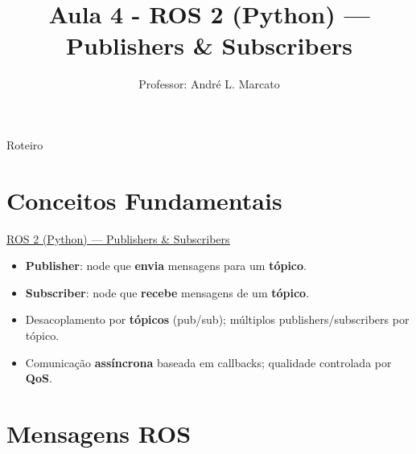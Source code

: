 \title[Aula 4]{Aula 4 - ROS 2 (Python) — Publishers \& Subscribers}
\author[Marcato]{Professor: André L. Marcato}

\begin{frame}
  \titlepage
\end{frame}

\begin{frame}{Roteiro}
\tableofcontents
\end{frame}

\section{Conceitos Fundamentais}

\begin{frame}[fragile]{\href{https://docs.ros.org/en/humble/Tutorials/Beginner-Client-Libraries/Writing-A-Simple-Py-Publisher-And-Subscriber.html}{\uline{ROS 2 (Python) — Publishers \& Subscribers}}}
    \begin{itemize}
      \item \textbf{Publisher}: node que \textbf{envia} mensagens para um \textbf{tópico}.
      \item \textbf{Subscriber}: node que \textbf{recebe} mensagens de um \textbf{tópico}.
      \item Desacoplamento por \textbf{tópicos} (pub/sub); múltiplos publishers/subscribers por tópico.
      \item Comunicação \textbf{assíncrona} baseada em callbacks; qualidade controlada por \textbf{QoS}.
    \end{itemize}
  \end{frame}

  \section{Mensagens ROS}

